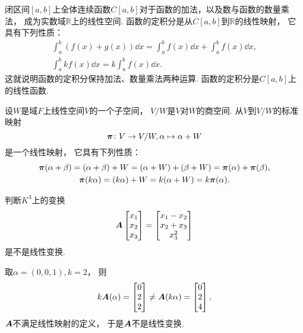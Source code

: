 \begin{example}
闭区间\([a,b]\)上全体连续函数\(C[a,b]\)对于函数的加法，以及数与函数的数量乘法，
成为实数域\(\mathbb{R}\)上的线性空间.
函数的定积分是从\(C[a,b]\)到\(\mathbb{R}\)的线性映射，
它具有下列性质：\begin{gather*}
	\int_a^b (f(x) + g(x)) \dd{x}
	= \int_a^b f(x) \dd{x} + \int_a^b f(x) \dd{x}, \\
	\int_a^b k f(x) \dd{x}
	= k \int_a^b f(x) \dd{x}.
\end{gather*}
这就说明函数的定积分保持加法、数量乘法两种运算.
函数的定积分是\(C[a,b]\)上的线性函数.
\end{example}

\begin{example}
设\(W\)是域\(F\)上线性空间\(V\)的一个子空间，
\(V/W\)是\(V\)对\(W\)的商空间.
从\(V\)到\(V/W\)的标准映射\[
	\boldsymbol\pi\colon V \to V/W,
	\alpha \mapsto \alpha+W
\]是一个线性映射，
它具有下列性质：\begin{gather*}
	\boldsymbol\pi(\alpha+\beta)
	= (\alpha+\beta)+W
	= (\alpha+W) + (\beta+W)
	= \boldsymbol\pi(\alpha) + \boldsymbol\pi(\beta), \\
	\boldsymbol\pi(k\alpha)
	= (k\alpha)+W
	= k(\alpha+W)
	= k\boldsymbol\pi(\alpha).
\end{gather*}
\end{example}

\begin{example}
判断\(K^3\)上的变换\[
	\boldsymbol{A}
	\begin{bmatrix}
		x_1 \\ x_2 \\ x_3
	\end{bmatrix}
	= \begin{bmatrix}
		x_1 - x_2 \\
		x_2 + x_3 \\
		x_3^2
	\end{bmatrix}
\]是不是线性变换.
\begin{solution}
取\(\alpha=(0,0,1),
k=2\)，
则\[
	k\boldsymbol{A}(\alpha)
	= \begin{bmatrix}
		0 \\ 2 \\ 2
	\end{bmatrix}
	\neq
	\boldsymbol{A}(k\alpha)
	= \begin{bmatrix}
		0 \\ 2 \\ 4
	\end{bmatrix},
\]
\(\boldsymbol{A}\)不满足线性映射的定义，
于是\(\boldsymbol{A}\)不是线性变换.
\end{solution}
\end{example}


